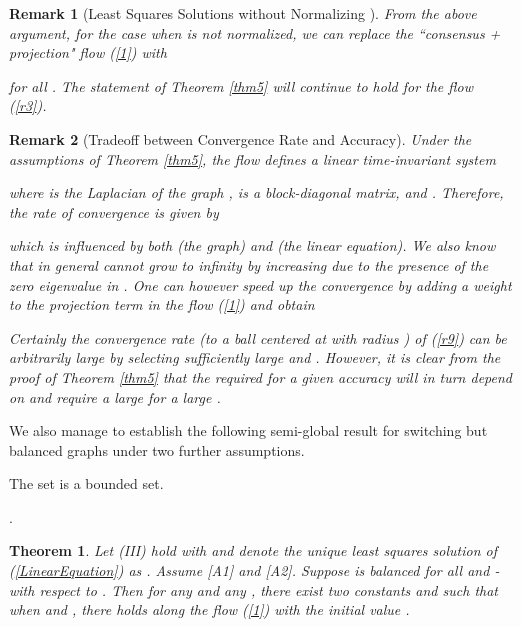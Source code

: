 \documentclass[a4paper, 11pt]{article}
\newtheorem{theorem}{Theorem}
\newtheorem{remark}{Remark}
\begin{document}
\begin{remark}[Least Squares Solutions without Normalizing ]
From the above argument, for the case when  is not normalized, we can replace the ``consensus + projection" flow (\ref{1}) with

 for all . The statement  of Theorem \ref{thm5} will continue to hold for the flow (\ref{r3}).
\end{remark}


\begin{remark}[Tradeoff between Convergence Rate and Accuracy]
Under the assumptions of Theorem \ref{thm5}, the flow defines a  linear time-invariant system

where  is the Laplacian of the graph ,   is a block-diagonal matrix, and . Therefore, the rate of convergence is given by
 
   which is influenced by both  (the graph) and  (the linear equation). We also know that   in general cannot grow to infinity by increasing  due to the presence of the zero eigenvalue in . One can however speed up the convergence by adding a weight  to the projection term in the flow (\ref{1}) and obtain
   
  Certainly the convergence rate (to a ball centered at  with radius ) of (\ref{r9}) can be arbitrarily large  by selecting sufficiently large  and . However, it is clear from the proof of Theorem \ref{thm5} that the required  for a given accuracy   will in turn depend on  and require a large  for a large .







 \end{remark}




  We also manage to establish the following semi-global result for  switching but balanced graphs under two further assumptions.

\medskip

\noindent {\bf [A1]} The set  is a bounded set.

\noindent {\bf [A2]} .



\begin{theorem}\label{thm6}
Let (III) hold with  and  denote the unique least squares solution of (\ref{LinearEquation}) as . Assume [A1] and [A2].  Suppose  is balanced for all  and   - with respect to . Then   for any  and  any , there exist two constants  and  such that
when  and , there holds 
along  the flow (\ref{1}) with the initial value .
\end{theorem}
\end{document}
